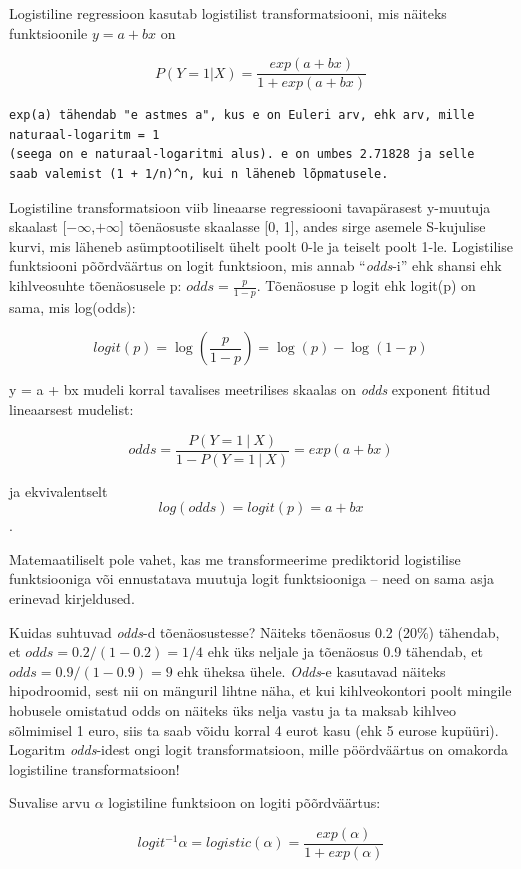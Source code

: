 \documentclass[]{book}
\begin{document}
Logistiline regressioon kasutab logistilist transformatsiooni, mis
näiteks funktsioonile \(y = a + bx\) on

\[P(Y = 1 | X) =\frac{exp(a + bx)}{1 + exp(a + bx)}\]

\begin{verbatim}
exp(a) tähendab "e astmes a", kus e on Euleri arv, ehk arv, mille naturaal-logaritm = 1 
(seega on e naturaal-logaritmi alus). e on umbes 2.71828 ja selle 
saab valemist (1 + 1/n)^n, kui n läheneb lõpmatusele.
\end{verbatim}

Logistiline transformatsioon viib lineaarse regressiooni tavapärasest
y-muutuja skaalast {[}\(-\infty\),\(+\infty\){]} tõenäosuste skaalasse
{[}0, 1{]}, andes sirge asemele S-kujulise kurvi, mis läheneb
asümptootiliselt ühelt poolt 0-le ja teiselt poolt 1-le. Logistilise
funktsiooni põõrdväärtus on logit funktsioon, mis annab
``\emph{odds}-i'' ehk shansi ehk kihlveosuhte tõenäosusele p:
\(odds = \frac {p}{1 - p}\). Tõenäosuse p logit ehk logit(p) on sama,
mis log(odds):

\[logit(p)=\log \left({\frac {p}{1-p}}\right)=\log(p)-\log(1-p)\]

y = a + bx mudeli korral tavalises meetrilises skaalas on \emph{odds}
exponent fititud lineaarsest mudelist:

\[odds= \frac {P(Y = 1 ~|~ X)}{1-P(Y = 1 ~|~ X)} = exp(a+bx)\]

ja ekvivalentselt \[log(odds) = logit(p) = a + bx\].

Matemaatiliselt pole vahet, kas me transformeerime prediktorid
logistilise funktsiooniga või ennustatava muutuja logit funktsiooniga --
need on sama asja erinevad kirjeldused.

Kuidas suhtuvad \emph{odds}-d tõenäosustesse? Näiteks tõenäosus 0.2
(20\%) tähendab, et \(odds = 0.2/(1 - 0.2) = 1/4\) ehk üks neljale ja
tõenäosus 0.9 tähendab, et \(odds = 0.9/(1 - 0.9) = 9\) ehk üheksa
ühele. \emph{Odds}-e kasutavad näiteks hipodroomid, sest nii on mänguril
lihtne näha, et kui kihlveokontori poolt mingile hobusele omistatud odds
on näiteks üks nelja vastu ja ta maksab kihlveo sõlmimisel 1 euro, siis
ta saab võidu korral 4 eurot kasu (ehk 5 eurose kupüüri). Logaritm
\emph{odds}-idest ongi logit transformatsioon, mille pöördväärtus on
omakorda logistiline transformatsioon!

Suvalise arvu \(\alpha\) logistiline funktsioon on logiti põõrdväärtus:

\[logit^{-1}\alpha=logistic (\alpha)={\frac {exp (\alpha) }{1+ exp (\alpha)}}\]
\end{document}
